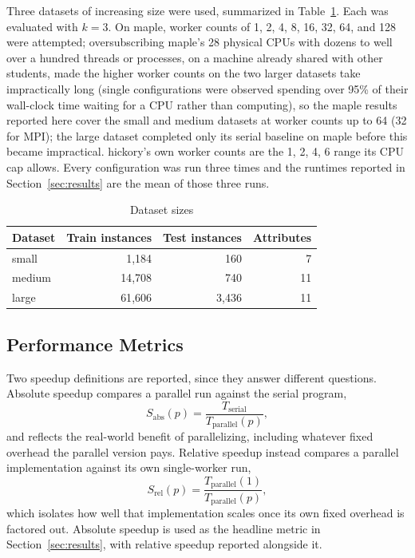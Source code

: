 \documentclass[conference]{IEEEtran}
\begin{document}
Three datasets of increasing size were used, summarized in
Table~\ref{tab:datasets}. Each was evaluated with $k=3$. On maple, worker
counts of 1, 2, 4, 8, 16, 32, 64, and 128 were attempted; oversubscribing
maple's 28 physical CPUs with dozens to well over a hundred threads or
processes, on a machine already shared with other students, made the
higher worker counts on the two larger datasets take impractically long
(single configurations were observed spending over 95\% of their wall-clock
time waiting for a CPU rather than computing), so the maple results
reported here cover the small and medium datasets at worker counts up to
64 (32 for MPI); the large dataset completed only its serial baseline on
maple before this became impractical. hickory's own worker counts are the
1, 2, 4, 6 range its CPU cap allows. Every configuration was run three
times and the runtimes reported in Section~\ref{sec:results} are the mean
of those three runs.

\begin{table}[htbp]
\caption{Dataset sizes}
\label{tab:datasets}
\centering
\begin{tabular}{lrrr}
\toprule
Dataset & Train instances & Test instances & Attributes \\
\midrule
small  & 1{,}184  & 160   & 7 \\
medium & 14{,}708 & 740   & 11 \\
large  & 61{,}606 & 3{,}436 & 11 \\
\bottomrule
\end{tabular}
\end{table}

\subsection{Performance Metrics}

Two speedup definitions are reported, since they answer different
questions. Absolute speedup compares a parallel run against the serial
program,
\begin{equation}
S_{\text{abs}}(p) = \frac{T_{\text{serial}}}{T_{\text{parallel}}(p)},
\label{eq:abs}
\end{equation}
and reflects the real-world benefit of parallelizing, including whatever
fixed overhead the parallel version pays. Relative speedup instead
compares a parallel implementation against its own single-worker run,
\begin{equation}
S_{\text{rel}}(p) = \frac{T_{\text{parallel}}(1)}{T_{\text{parallel}}(p)},
\label{eq:rel}
\end{equation}
which isolates how well that implementation scales once its own fixed
overhead is factored out. Absolute speedup is used as the headline metric
in Section~\ref{sec:results}, with relative speedup reported alongside it.
\end{document}
